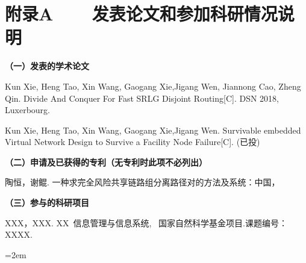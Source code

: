 
\chapter*{附录A~~~~发表论文和参加科研情况说明}
\setlength{\parindent}{0em}
\textbf{（一）发表的学术论文}
\begin{publist}
\item Kun Xie, Heng Tao, Xin Wang, Gaogang Xie,Jigang Wen, Jiannong Cao, Zheng Qin. Divide And Conquer For Fast SRLG Disjoint Routing[C]. DSN 2018, Luxerbourg.
\item Kun Xie, Heng Tao, Xin Wang, Gaogang Xie,Jigang Wen. Survivable embedded Virtual Network Design to Survive a Facility Node Failure[C]. (已投)
\end{publist}

\vspace*{1em}
\textbf{（二）申请及已获得的专利（无专利时此项不必列出）}
\begin{publist}
\item 陶恒，谢鲲. 一种求完全风险共享链路组分离路径对的方法及系统：中国，%
\end{publist}
\vspace*{1em}
\textbf{（三）参与的科研项目}
\begin{publist}
\item	XXX，XXX. XX~信息管理与信息系统, ~国家自然科学基金项目.课题编号：XXXX.
\end{publist}
\vfill
{}\hangindent=2em\noindent

\setlength{\parindent}{2em}
